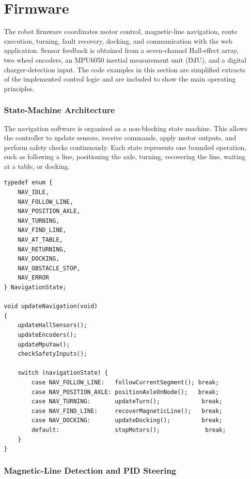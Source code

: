 \documentclass[12pt,a4paper]{article}
\begin{document}
\section{Firmware}
\label{subsec:firmware}

The robot firmware coordinates motor control, magnetic-line navigation, route
execution, turning, fault recovery, docking, and communication with the web
application. Sensor feedback is obtained from a seven-channel Hall-effect
array, two wheel encoders, an MPU6050 inertial measurement unit (IMU), and a
digital charger-detection input. The code examples in this section are
simplified extracts of the implemented control logic and are included to show
the main operating principles.

\subsubsection{State-Machine Architecture}

The navigation software is organised as a non-blocking state machine. This
allows the controller to update sensors, receive commands, apply motor outputs,
and perform safety checks continuously. Each state represents one bounded
operation, such as following a line, positioning the axle, turning, recovering
the line, waiting at a table, or docking.

\begin{lstlisting}[caption={Simplified navigation state machine.},label={lst:nav-state}]
typedef enum {
    NAV_IDLE,
    NAV_FOLLOW_LINE,
    NAV_POSITION_AXLE,
    NAV_TURNING,
    NAV_FIND_LINE,
    NAV_AT_TABLE,
    NAV_RETURNING,
    NAV_DOCKING,
    NAV_OBSTACLE_STOP,
    NAV_ERROR
} NavigationState;

void updateNavigation(void)
{
    updateHallSensors();
    updateEncoders();
    updateMpuYaw();
    checkSafetyInputs();

    switch (navigationState) {
        case NAV_FOLLOW_LINE:   followCurrentSegment(); break;
        case NAV_POSITION_AXLE: positionAxleOnNode();   break;
        case NAV_TURNING:       updateTurn();            break;
        case NAV_FIND_LINE:     recoverMagneticLine();   break;
        case NAV_DOCKING:       updateDocking();         break;
        default:                stopMotors();             break;
    }
}
\end{lstlisting}

\subsubsection{Magnetic-Line Detection and PID Steering}
\end{document}
